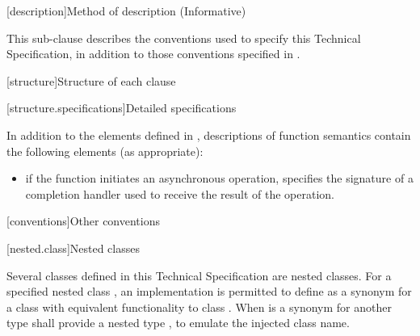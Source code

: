 
[description]{Method of description (Informative)}

\pnum
 This sub-clause describes the conventions used to specify this Technical Specification, in addition to those conventions specified in .


[structure]{Structure of each clause}


[structure.specifications]{Detailed specifications}

\pnum
In addition to the elements defined in , descriptions of function semantics contain the following elements (as appropriate):

\begin{itemize}
\item
\completionsig if the function initiates an asynchronous operation, specifies the signature of a completion handler used to receive the result of the operation.
\end{itemize}




[conventions]{Other conventions}


[nested.class]{Nested classes}

\pnum
Several classes defined in this Technical Specification are nested classes.
For a specified nested class , an implementation is permitted to
define  as a synonym for a class with equivalent functionality to
class . \enternote When  is a synonym for another
type  shall provide a nested type , to emulate the injected
class name. \exitnote


